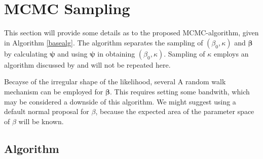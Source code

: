 \documentclass[12pt,a4paper]{article}\usepackage[]{graphicx}\usepackage[]{color}
\begin{document}
\section{MCMC Sampling}

This section will provide some details as to the proposed MCMC-algorithm, given in Algorithm \ref{basealg}. The algorithm separates the sampling of $(\beta_0, \kappa)$ and $\boldsymbol\beta$ by calculating $\boldsymbol\psi$ and using $\boldsymbol\psi$ in obtaining $(\beta_0, \kappa)$. Sampling of $\kappa$ employs an algorithm discussed by \citet{forbes2014fast} and will not be repeated here.

Becayse of the irregular shape of the likelihood, several
A random walk mechanism can be employed for $\boldsymbol\beta$. This requires setting some bandwith, which may be considered a downside of this algorithm. We might suggest using a default normal proposal for $\beta$, because the expected area of the parameter space of $\beta$ will be known.


\subsection{Algorithm}
%
%
%
%
%
%
%
%
%
%
%
%
%
%
%
%
%
%
\end{document}
